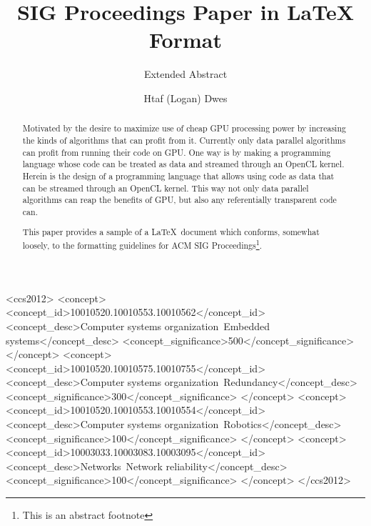 \documentclass[sigconf]{acmart}
\begin{document}
\title{SIG Proceedings Paper in LaTeX Format}
\subtitle{Extended Abstract}



\author{Htaf (Logan) Dwes}
\renewcommand{\shortauthors}{B. Trovato et al.}


\begin{abstract}
Motivated by the desire to maximize use of cheap GPU processing power by
increasing the kinds of algorithms that can profit from it.
Currently only data parallel algorithms can profit from running their code on 
GPU.\@
One way is by making a programming language whose code can be treated as data 
and streamed through an OpenCL kernel. 
Herein is the design of a programming language that allows using code as data
that can be streamed through an OpenCL kernel. 
This way not only data parallel
algorithms can reap the benefits of GPU, but also any referentially transparent
code can. 
\end{abstract}

\begin{abstract}
This paper provides a sample of a \LaTeX\ document which conforms,
somewhat loosely, to the formatting guidelines for
ACM SIG Proceedings\footnote{This is an abstract footnote}. 
\end{abstract}

%
%
\begin{CCSXML}
<ccs2012>
 <concept>
  <concept_id>10010520.10010553.10010562</concept_id>
  <concept_desc>Computer systems organization~Embedded systems</concept_desc>
  <concept_significance>500</concept_significance>
 </concept>
 <concept>
  <concept_id>10010520.10010575.10010755</concept_id>
  <concept_desc>Computer systems organization~Redundancy</concept_desc>
  <concept_significance>300</concept_significance>
 </concept>
 <concept>
  <concept_id>10010520.10010553.10010554</concept_id>
  <concept_desc>Computer systems organization~Robotics</concept_desc>
  <concept_significance>100</concept_significance>
 </concept>
 <concept>
  <concept_id>10003033.10003083.10003095</concept_id>
  <concept_desc>Networks~Network reliability</concept_desc>
  <concept_significance>100</concept_significance>
 </concept>
</ccs2012>  
\end{CCSXML}
\end{document}
